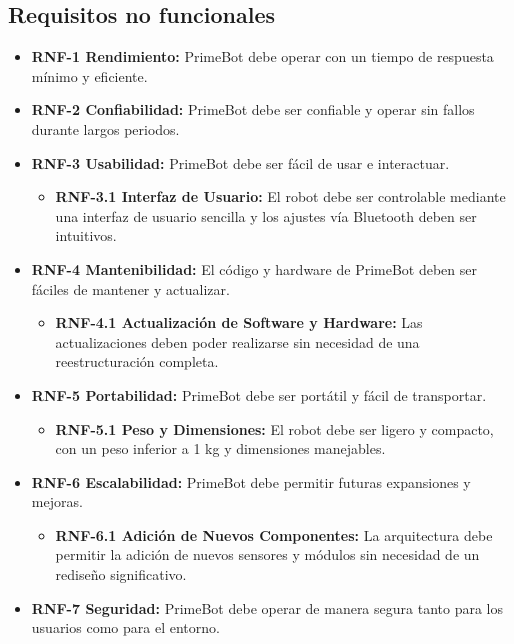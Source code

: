 \subsection{Requisitos no funcionales}\label{requisitos-no-funcionales}
\begin{itemize}
\tightlist
\item
\textbf{RNF-1 Rendimiento:} PrimeBot debe operar con un tiempo de respuesta mínimo y eficiente.
\item
\textbf{RNF-2 Confiabilidad:} PrimeBot debe ser confiable y operar sin fallos durante largos periodos.
\item
\textbf{RNF-3 Usabilidad:} PrimeBot debe ser fácil de usar e interactuar.

\begin{itemize}
\tightlist
\item
\textbf{RNF-3.1 Interfaz de Usuario:} El robot debe ser controlable mediante una interfaz de usuario sencilla y los ajustes vía Bluetooth deben ser intuitivos.
\end{itemize}
\item
\textbf{RNF-4 Mantenibilidad:} El código y hardware de PrimeBot deben ser fáciles de mantener y actualizar.

\begin{itemize}
\tightlist
\item
\textbf{RNF-4.1 Actualización de Software y Hardware:} Las actualizaciones deben poder realizarse sin necesidad de una reestructuración completa.
\end{itemize}
\item
\textbf{RNF-5 Portabilidad:} PrimeBot debe ser portátil y fácil de transportar.

\begin{itemize}
\tightlist
\item
\textbf{RNF-5.1 Peso y Dimensiones:} El robot debe ser ligero y compacto, con un peso inferior a 1 kg y dimensiones manejables.
\end{itemize}
\item
\textbf{RNF-6 Escalabilidad:} PrimeBot debe permitir futuras expansiones y mejoras.

\begin{itemize}
\tightlist
\item
\textbf{RNF-6.1 Adición de Nuevos Componentes:} La arquitectura debe permitir la adición de nuevos sensores y módulos sin necesidad de un rediseño significativo.
\end{itemize}
\item
\textbf{RNF-7 Seguridad:} PrimeBot debe operar de manera segura tanto para los usuarios como para el entorno.
\end{itemize}

